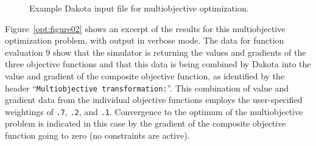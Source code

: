 \begin{figure}
\centering
\begin{bigbox}
\begin{small}
\end{small}
\end{bigbox}
\caption{Example Dakota input file for multiobjective optimization.}
\label{opt:figure01}
\end{figure}

Figure~\ref{opt:figure02} shows an excerpt of the results for this
multiobjective optimization problem, with output in verbose mode. The
data for function evaluation 9 show that the simulator is returning
the values and gradients of the three objective functions and that
this data is being combined by Dakota into the value and gradient of
the composite objective function, as identified by the header
``\texttt{Multiobjective transformation:}''. This combination of value
and gradient data from the individual objective functions employs the
user-specified weightings of \texttt{.7}, \texttt{.2}, and
\texttt{.1}. Convergence to the optimum of the multiobjective problem
is indicated in this case by the gradient of the composite objective
function going to zero (no constraints are active).

